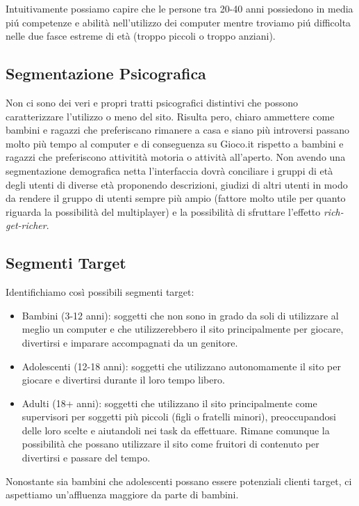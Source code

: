 \documentclass[../Report.tex]{subfiles}
\begin{document}
    Intuitivamente possiamo capire che le persone tra 20-40 anni possiedono in media piú competenze e abilità nell’utilizzo dei computer mentre troviamo piú difficolta nelle due fasce estreme di età (troppo piccoli o troppo anziani).
    
    \subsection{Segmentazione Psicografica}

    Non ci sono dei veri e propri tratti psicografici distintivi che possono caratterizzare l'utilizzo o meno del sito. Risulta pero, chiaro ammettere come bambini e ragazzi che preferiscano rimanere a casa e siano più introversi passano molto più tempo al computer e di conseguenza su Gioco.it rispetto a bambini e ragazzi che preferiscono attivitità motoria o attività all'aperto. 
    Non avendo una segmentazione demografica netta l’interfaccia dovrà conciliare i gruppi di età degli utenti di diverse età proponendo descrizioni, giudizi di altri utenti in modo da rendere il gruppo di utenti sempre più ampio (fattore molto utile per quanto riguarda la possibilità del multiplayer) e la possibilità di sfruttare l'effetto \emph{rich-get-richer}.

    \subsection{Segmenti Target}
    Identifichiamo così possibili segmenti target:
    \begin{itemize}
        \item Bambini (3-12 anni): soggetti che non sono in grado da soli di utilizzare al meglio un computer e che utilizzerebbero il sito principalmente per giocare, divertirsi e imparare accompagnati da un genitore.
        \item Adolescenti (12-18 anni): soggetti che utilizzano autonomamente il sito per giocare e divertirsi durante il loro tempo libero. 
        \item Adulti (18+ anni): soggetti che utilizzano il sito principalmente come supervisori per soggetti più piccoli (figli o fratelli minori), preoccupandosi delle loro scelte e aiutandoli nei task da effettuare. Rimane comunque la possibilità che possano utilizzare il sito come fruitori di contenuto per divertirsi e passare del tempo.       
    \end{itemize}
    Nonostante sia bambini che adolescenti possano essere potenziali clienti target, ci aspettiamo un'affluenza maggiore da parte di bambini.
\end{document}
